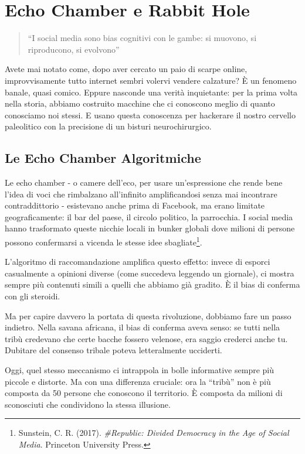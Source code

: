 \chapter{Echo Chamber e Rabbit Hole}

\begin{quotation}
``I social media sono bias cognitivi con le gambe: si muovono, si riproducono, si evolvono''
\end{quotation}

Avete mai notato come, dopo aver cercato un paio di scarpe online, improvvisamente tutto internet sembri volervi vendere calzature? È un fenomeno banale, quasi comico. Eppure nasconde una verità inquietante: per la prima volta nella storia, abbiamo costruito macchine che ci conoscono meglio di quanto conosciamo noi stessi. E usano questa conoscenza per hackerare il nostro cervello paleolitico con la precisione di un bisturi neurochirurgico.
\section{Le Echo Chamber Algoritmiche}

Le echo chamber - o camere dell'eco, per usare un'espressione che rende bene l'idea di voci che rimbalzano all'infinito amplificandosi senza mai incontrare contraddittorio - esistevano anche prima di Facebook, ma erano limitate geograficamente: il bar del paese, il circolo politico, la parrocchia. I social media hanno trasformato queste nicchie locali in bunker globali dove milioni di persone possono confermarsi a vicenda le stesse idee sbagliate\footnote{Sunstein, C. R. (2017). \textit{\#Republic: Divided Democracy in the Age of Social Media}. Princeton University Press.}.


L'algoritmo di raccomandazione amplifica questo effetto: invece di esporci casualmente a opinioni diverse (come succedeva leggendo un giornale), ci mostra sempre più contenuti simili a quelli che abbiamo già gradito. È il bias di conferma con gli steroidi.

Ma per capire davvero la portata di questa rivoluzione, dobbiamo fare un passo indietro. Nella savana africana, il bias di conferma aveva senso: se tutti nella tribù credevano che certe bacche fossero velenose, era saggio crederci anche tu. Dubitare del consenso tribale poteva letteralmente ucciderti.

Oggi, quel stesso meccanismo ci intrappola in bolle informative sempre più piccole e distorte. Ma con una differenza cruciale: ora la ``tribù'' non è più composta da 50 persone che conoscono il territorio. È composta da milioni di sconosciuti che condividono la stessa illusione.

